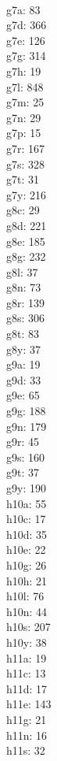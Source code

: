 \begin{multicols}{8}
  \\ g7a: 83
  \\ g7d: 366
  \\ g7e: 126
  \\ g7g: 314
  \\ g7h: 19
  \\ g7l: 848
  \\ g7m: 25
  \\ g7n: 29
  \\ g7p: 15
  \\ g7r: 167
  \\ g7s: 328
  \\ g7t: 31
  \\ g7y: 216
  \\ g8c: 29
  \\ g8d: 221
  \\ g8e: 185
  \\ g8g: 232
  \\ g8l: 37
  \\ g8n: 73
  \\ g8r: 139
  \\ g8s: 306
  \\ g8t: 83
  \\ g8y: 37
  \\ g9a: 19
  \\ g9d: 33
  \\ g9e: 65
  \\ g9g: 188
  \\ g9n: 179
  \\ g9r: 45
  \\ g9s: 160
  \\ g9t: 37
  \\ g9y: 190
  \\ h10a: 55
  \\ h10c: 17
  \\ h10d: 35
  \\ h10e: 22
  \\ h10g: 26
  \\ h10h: 21
  \\ h10l: 76
  \\ h10n: 44
  \\ h10s: 207
  \\ h10y: 38
  \\ h11a: 19
  \\ h11c: 13
  \\ h11d: 17
  \\ h11e: 143
  \\ h11g: 21
  \\ h11n: 16
  \\ h11s: 32

\end{multicols}
